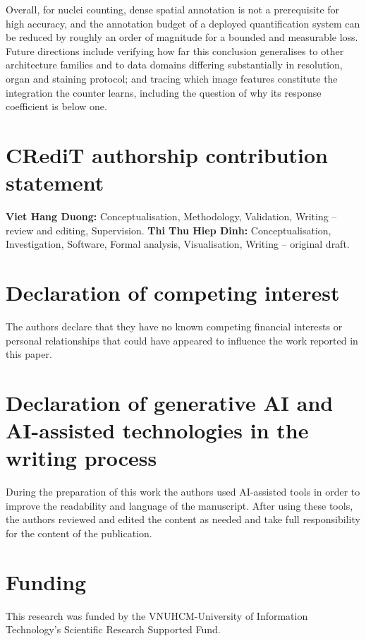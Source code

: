 \documentclass[preprint,12pt]{elsarticle}
\begin{document}
Overall, for nuclei counting, dense spatial annotation is not a prerequisite for high accuracy, and the
annotation budget of a deployed quantification system can be reduced by roughly an order of magnitude for a
bounded and measurable loss. Future directions include verifying how far this conclusion generalises to other
architecture families and to data domains differing substantially in resolution, organ and staining protocol;
and tracing which image features constitute the integration the counter learns, including the question of why
its response coefficient is below one.

\section*{CRediT authorship contribution statement}
\textbf{Viet Hang Duong:} Conceptualisation, Methodology, Validation, Writing -- review and editing,
Supervision. \textbf{Thi Thu Hiep Dinh:} Conceptualisation, Investigation, Software, Formal analysis,
Visualisation, Writing -- original draft.

\section*{Declaration of competing interest}
The authors declare that they have no known competing financial interests or personal relationships that could
have appeared to influence the work reported in this paper.

\section*{Declaration of generative AI and AI-assisted technologies in the writing process}
During the preparation of this work the authors used AI-assisted tools in order to improve the readability and
language of the manuscript. After using these tools, the authors reviewed and edited the content as needed and
take full responsibility for the content of the publication.

\section*{Funding}
This research was funded by the VNUHCM-University of Information Technology's Scientific Research Supported
Fund.
\end{document}
